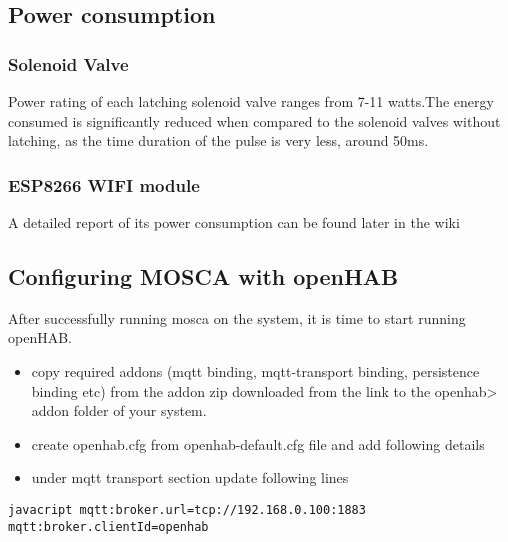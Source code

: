 \documentclass[16pt]{article}
\begin{document}
\hfill

\subsection{Power consumption}



 
\subsubsection{Solenoid Valve}

Power rating of each latching solenoid valve
ranges from 7-11 watts.The energy consumed is significantly reduced when
compared to the solenoid valves without latching, as the time duration
of the pulse is very less, around 50ms.

\subsubsection{ESP8266 WIFI module}

A detailed report of its power consumption can be found later in the
wiki



\subsection{Configuring MOSCA with
openHAB}


After successfully running mosca on the system, it is time to start
running openHAB.

\begin{itemize}

\item
  copy required addons (mqtt binding, mqtt-transport binding,
  persistence binding etc) from the addon zip downloaded from the
  link to the openhab\textgreater{} addon folder of your system.
\item
  create openhab.cfg from openhab-default.cfg file and add following
  details
\item
  under mqtt transport section update following lines
\end{itemize}

\texttt{javacript       mqtt:broker.url=tcp://192.168.0.100:1883       mqtt:broker.clientId=openhab}
\end{document}
